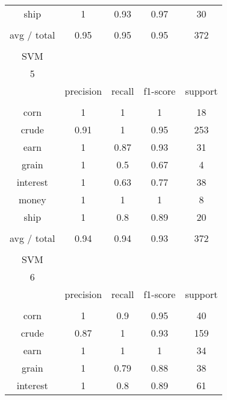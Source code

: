 \documentclass[11pt]{article}
\begin{document}
\begin{center}
\begin{longtable}{| c | c | c | c | c |}
ship        & 1         & 0.93   & 0.97     & 30      \\
           &           &        &          &         \\
avg / total & 0.95      & 0.95   & 0.95     & 372     \\
           &           &        &          &         \\
SVM         &           &        &          &         \\
5           &           &        &          &         \\
           & precision & recall & f1-score & support \\
           &           &        &          &         \\
corn        & 1         & 1      & 1        & 18      \\
crude       & 0.91      & 1      & 0.95     & 253     \\
earn        & 1         & 0.87   & 0.93     & 31      \\
grain       & 1         & 0.5    & 0.67     & 4       \\
interest    & 1         & 0.63   & 0.77     & 38      \\
money       & 1         & 1      & 1        & 8       \\
ship        & 1         & 0.8    & 0.89     & 20      \\
           &           &        &          &         \\
avg / total & 0.94      & 0.94   & 0.93     & 372     \\
           &           &        &          &         \\
SVM         &           &        &          &         \\
6           &           &        &          &         \\
           & precision & recall & f1-score & support \\
           &           &        &          &         \\
corn        & 1         & 0.9    & 0.95     & 40      \\
crude       & 0.87      & 1      & 0.93     & 159     \\
earn        & 1         & 1      & 1        & 34      \\
grain       & 1         & 0.79   & 0.88     & 38      \\
interest    & 1         & 0.8    & 0.89     & 61      \\

\end{longtable}
\end{center}
\end{document}
